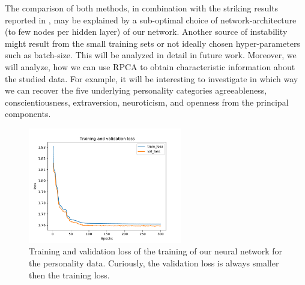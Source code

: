 The comparison of both methods, in combination with the striking results reported in \cite{herrera2020denise}, may be explained by a sub-optimal choice of network-architecture (to few nodes per hidden layer) of our network. Another source of instability might result from the small training sets or not ideally chosen hyper-parameters such as batch-size. This will be analyzed in detail in future work. Moreover, we will analyze, how we can use RPCA to obtain characteristic information about the studied data. For example, it will be interesting to investigate in which way we can recover the five underlying personality categories agreeableness, conscientiousness, extraversion, neuroticism, and openness from the principal components.


\begin{figure}
	\centering
	\includegraphics[width=0.6\textwidth]{fig/loss_psych.pdf}
	\caption{Training and validation loss of the training of our neural network for the personality data. Curiously, the validation loss is always smaller then the training loss.}
	\label{fig:personality_training}
\end{figure}


